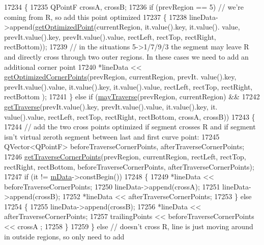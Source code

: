 \begin{DoxyCode}
17234       \{
17235         QPointF crossA, crossB;
17236         \textcolor{keywordflow}{if} (prevRegion == 5) \textcolor{comment}{// we're coming from R, so add this point optimized}
17237         \{
17238           lineData->append(\hyperlink{class_q_c_p_curve_acbcfea8986dde6c0143e3f7e8e76041d}{getOptimizedPoint}(currentRegion, it.value().key, it.value().
      value, prevIt.value().key, prevIt.value().value, rectLeft, rectTop, rectRight, rectBottom));
17239           \textcolor{comment}{// in the situations 5->1/7/9/3 the segment may leave R and directly cross through two outer
       regions. In these cases we need to add an additional corner point}
17240           *lineData << \hyperlink{class_q_c_p_curve_aad0b69d9a7a2a5367fcc9fe3edaf9bf4}{getOptimizedCornerPoints}(prevRegion, currentRegion, prevIt.
      value().key, prevIt.value().value, it.value().key, it.value().value, rectLeft, rectTop, rectRight, rectBottom
      );
17241         \} \textcolor{keywordflow}{else} \textcolor{keywordflow}{if} (\hyperlink{class_q_c_p_curve_ae5b232c8201441a940516c745309a685}{mayTraverse}(prevRegion, currentRegion) &&
17242                    \hyperlink{class_q_c_p_curve_ab4ffdf3d62d5bd3a187f6668daf01f85}{getTraverse}(prevIt.value().key, prevIt.value().value, it.value().key, it.
      value().value, rectLeft, rectTop, rectRight, rectBottom, crossA, crossB))
17243         \{
17244           \textcolor{comment}{// add the two cross points optimized if segment crosses R and if segment isn't virtual zeroth
       segment between last and first curve point:}
17245           QVector<QPointF> beforeTraverseCornerPoints, afterTraverseCornerPoints;
17246           \hyperlink{class_q_c_p_curve_abe1721b19669e7127d76d144660fbeb8}{getTraverseCornerPoints}(prevRegion, currentRegion, rectLeft, rectTop, 
      rectRight, rectBottom, beforeTraverseCornerPoints, afterTraverseCornerPoints);
17247           \textcolor{keywordflow}{if} (it != \hyperlink{class_q_c_p_curve_a88d533e455bca96004b049e99168731b}{mData}->constBegin())
17248           \{
17249             *lineData << beforeTraverseCornerPoints;
17250             lineData->append(crossA);
17251             lineData->append(crossB);
17252             *lineData << afterTraverseCornerPoints;
17253           \} \textcolor{keywordflow}{else}
17254           \{
17255             lineData->append(crossB);
17256             *lineData << afterTraverseCornerPoints;
17257             trailingPoints << beforeTraverseCornerPoints << crossA ;
17258           \}
17259         \} \textcolor{keywordflow}{else} \textcolor{comment}{// doesn't cross R, line is just moving around in outside regions, so only need to add
}
\end{DoxyCode}
